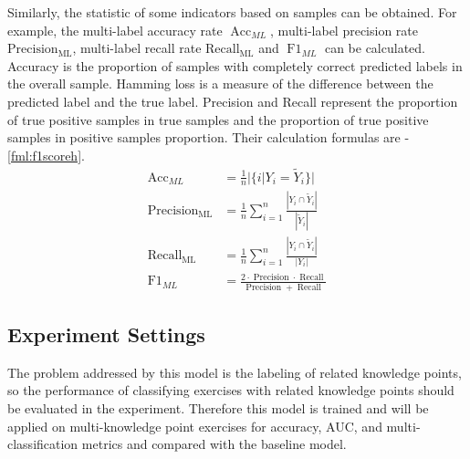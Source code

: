 Similarly, the statistic of some indicators based on samples can be obtained. For example, the multi-label accuracy rate \(\operatorname{Acc}_{ML}\), multi-label precision rate \(\operatorname{Precision_{ML}}\), multi-label recall rate \(\operatorname{Recall_{ML}}\) and \(\operatorname{F1}_{ML}\) can be calculated. Accuracy is the proportion of samples with completely correct predicted labels in the overall sample. Hamming loss is a measure of the difference between the predicted label and the true label. Precision and Recall represent the proportion of true positive samples in true samples and the proportion of true positive samples in positive samples proportion. Their calculation formulas are \eqname{\ref{fml:subaccuracy}}-{\ref{fml:f1scoreh}}.
\begin{align}
    \operatorname{Acc}_{ML}       & =\frac{1}{n} |\{i|Y_i=\tilde{Y}_i\}| \label{fml:subaccuracy}                                                                              \\
    \operatorname{Precision_{ML}} & =\frac{1}{n} \sum_{i=1}^{n} \frac{|Y_{i} \cap \tilde{Y}_i|}{|\tilde{Y}_i|} \label{fml:Precisionh}                                         \\
    \operatorname{Recall_{ML}}    & =\frac{1}{n} \sum_{i=1}^{n} \frac{|Y_{i} \cap \tilde{Y}_i|}{|Y_{i}|}    \label{fml:Recallh}                                               \\
    \operatorname{F1}_{ML}        & =\frac{2 \cdot \operatorname{Precision} \cdot \operatorname{Recall}}{\operatorname{Precision}+\operatorname{Recall}} \label{fml:f1scoreh}
\end{align}

\subsection{Experiment Settings}
The problem addressed by this model is the labeling of related knowledge points, so the performance of classifying exercises with related knowledge points should be evaluated in the experiment. Therefore this model is trained and will be applied on multi-knowledge point exercises for accuracy, AUC, and multi-classification metrics and compared with the baseline model.

